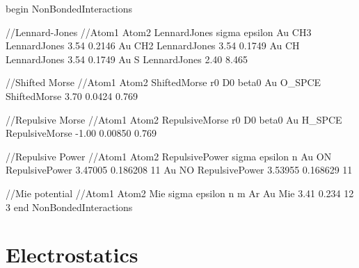 \documentclass[]{book}
\begin{document}
\begin{code}[caption={[An example of a NonBondedInteractions block.] A
simple example of a NonBondedInteractions block. Distances ($\sigma,
r_0$) are given in \AA, while energies ($\epsilon, D0$) are in
kcal/mol.  The Morse potentials have an additional parameter $\beta_0$
which is in units of \AA$^{-1}$.},
label={sch:NonBondedInteractionTypes}]
begin NonBondedInteractions

//Lennard-Jones
//Atom1 Atom2   LennardJones    sigma  epsilon
Au      CH3     LennardJones    3.54   0.2146
Au      CH2     LennardJones    3.54   0.1749 
Au      CH      LennardJones    3.54   0.1749 
Au      S       LennardJones    2.40   8.465

//Shifted Morse
//Atom1 Atom2   ShiftedMorse    r0     D0       beta0
Au      O_SPCE  ShiftedMorse    3.70   0.0424   0.769

//Repulsive Morse
//Atom1 Atom2   RepulsiveMorse  r0     D0       beta0
Au      H_SPCE  RepulsiveMorse  -1.00  0.00850  0.769

//Repulsive Power
//Atom1 Atom2   RepulsivePower   sigma    epsilon    n
Au      ON      RepulsivePower   3.47005  0.186208   11
Au      NO      RepulsivePower   3.53955  0.168629   11

//Mie potential
//Atom1 Atom2   Mie              sigma   epsilon  n  m
Ar      Au      Mie              3.41    0.234   12  3
end NonBondedInteractions
\end{code}

\section{\label{section:electrostatics}Electrostatics}
\end{document}
